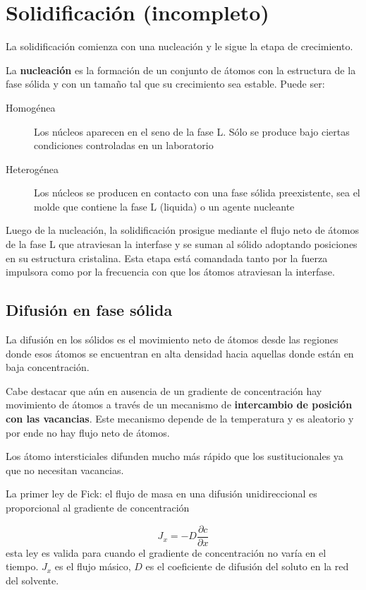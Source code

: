 \section{Solidificación (incompleto)}

La solidificación comienza con una nucleación y le sigue la etapa de crecimiento.

La \textbf{nucleación} es la formación de un conjunto de átomos con la estructura de la fase sólida y con un tamaño tal que su crecimiento sea estable. Puede ser:

\begin{description}
	\item[Homogénea] Los núcleos aparecen en el seno de la fase L. Sólo se produce bajo ciertas condiciones controladas en un laboratorio
	\item[Heterogénea] Los núcleos se producen en contacto con una fase sólida preexistente, sea el molde que contiene la fase L (liquida) o un agente nucleante
\end{description}


Luego de la nucleación, la solidificación prosigue mediante el flujo neto de átomos de la fase L que atraviesan la interfase y se suman al sólido adoptando posiciones en su estructura cristalina. Esta etapa está comandada tanto por la fuerza impulsora como por la frecuencia con que los átomos atraviesan la interfase.

\subsection{Difusión en fase sólida}

La difusión en los sólidos es el movimiento neto de átomos desde las regiones donde esos átomos se encuentran en alta densidad hacia aquellas donde están en baja concentración.

Cabe destacar que aún en ausencia de un gradiente de concentración hay movimiento de átomos a través de un mecanismo de \textbf{intercambio de posición con las vacancias}. Este mecanismo depende de la temperatura y es aleatorio y por ende no hay flujo neto de átomos.

Los átomo intersticiales difunden mucho más rápido que los sustitucionales ya que no necesitan vacancias.


La primer ley de Fick: el flujo de masa en una difusión unidireccional es proporcional al gradiente de concentración

\begin{equation}
	J_x = - D \frac{\partial c}{\partial x}
\end{equation}
esta ley es valida para cuando el gradiente de concentración no varía en el tiempo. $J_x$ es el flujo másico, $D$ es el coeficiente de difusión del soluto en la red del solvente.


